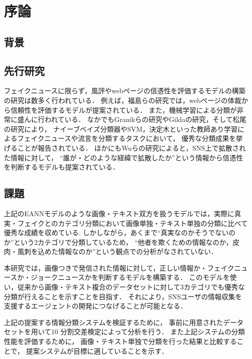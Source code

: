 \chapter{序論}
%
\section{背景}


\section{先行研究}
フェイクニュースに限らず，風評やwebページの信憑性を評価するモデルの構築の研究は数多く行われている．
例えば，福島らの研究\cite{fuk}では，webページの体裁から信頼性を評価するモデルが提案されている．
また，機械学習による分類が非常に盛んに行われている．
なかでもGranikらの研究\cite{gra}やGildaの研究\cite{gil}，そして松尾の研究\cite{mat}により，
ナイーブベイズ分類器やSVM，決定木といった教師あり学習によるフェイクニュースや流言を分類するタスクにおいて，
優秀な分類成果を挙げることが報告されている．
ほかにもWuらの研究\cite{wu}によると，SNS上で拡散された情報に対して，
``誰が・どのような経緯で拡散したか''という情報から信憑性を判断するモデルも提案されている． 


\section{課題}
上記のEANNモデルのような画像・テキスト双方を扱うモデルでは，実際に真実・フェイクとのカテゴリ分類において画像単独・テキスト単独の分類に比べて優秀な成績を収めている\cite{eann}.\@
しかしながら，あくまで``真実なのかそうでないのか''という2カテゴリで分類しているため，
``他者を欺くための情報なのか，皮肉・風刺を込めた情報なのか''という観点での分析がなされていない．

本研究では，画像つきで発信された情報に対して，正しい情報か・フェイクニュースか・ジョークニュースかを判断するモデルを構築する．
このモデルを使い，従来から画像・テキスト複合のデータセットに対して3カテゴリでも優秀な分類が行えることを示すことを目指す．
それにより，SNSユーザの情報収集を支援するエージェントの開発につなげることが可能となる．

上記の提案する情報分類システムを検証するために，
事前に用意されたデータセットを用いて10 分割交差検定によって分析を行う．
また上記システムの分類性能を評価するために，
画像・テキスト単独で分類を行った結果と比較することで，
提案システムが目標に適していることを示す．

% 
